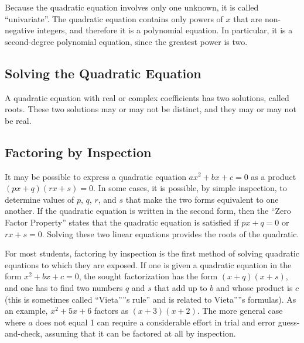 Because the quadratic equation involves only one unknown, it is called ``univariate''. The quadratic equation contains only powers of $x$ that are non-negative integers, and therefore it is a polynomial equation. In particular, it is a second-degree polynomial equation, since the greatest power is two.

\subsection{Solving the Quadratic Equation}
\label{sss:solv-8ae7}

A quadratic equation with real or complex coefficients has two solutions, called roots.
These two solutions may or may not be distinct, and they may or may not be real.

\subsection{Factoring by Inspection}
\label{sss:fact-1b61}

It may be possible to express a quadratic equation $ax^2 + bx + c = 0$ as a product $(px + q)(rx + s) = 0$. In some cases, it is possible, by simple inspection, to determine values of $p$, $q$, $r$, and $s$ that make the two forms equivalent to one another. If the quadratic equation is written in the second form, then the ``Zero Factor Property'' states that the quadratic equation is satisfied if $px + q = 0$ or $rx + s = 0$. Solving these two linear equations provides the roots of the quadratic.

For most students, factoring by inspection is the first method of solving quadratic equations to which they are exposed. If one is given a quadratic equation in the form $x^2 + bx + c = 0$, the sought factorization has the form $(x + q)(x + s)$, and one has to find two numbers $q$ and $s$ that add up to $b$ and whose product is $c$ (this is sometimes called ``Vieta''''s rule'' and is related to Vieta''''s formulas). As an example, $x^2 + 5x + 6$ factors as $(x + 3)(x + 2)$. The more general case where $a$ does not equal 1 can require a considerable effort in trial and error guess-and-check, assuming that it can be factored at all by inspection.

